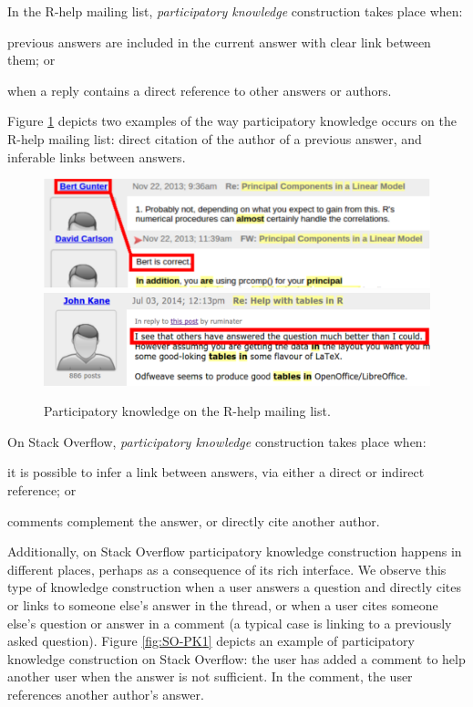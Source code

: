 In the R-help mailing list, \textit{participatory knowledge} construction takes place when:
\begin{enumerate*}[label=(\arabic*)]
  \item previous answers are included in the current answer with clear link between them; or
  \item when a reply contains a direct reference to other answers or authors.
\end{enumerate*}
Figure \ref{fig:ML-PK1} depicts two examples of the way participatory knowledge occurs on the R-help mailing list: direct citation of the author of a previous answer, and inferable links between answers.

    
    \begin{figure}[!htb]
        \centering
        \includegraphics[width=\columnwidth]{Figures/ML-PKimg2}
        \includegraphics[width=\columnwidth]{Figures/ML-PKimg11}
        \caption[Participatory knowledge on the R-help mailing list.]{Participatory knowledge on the R-help mailing list.}
        \label{fig:ML-PK1}
      \vspace{-3mm}
    \end{figure}

On Stack Overflow, \textit{participatory knowledge} construction takes place when:
    \begin{enumerate*}[label=(\arabic*)]
    \item it is possible to infer a link between answers, via either a direct or indirect reference; or
    \item comments complement the answer, or directly cite another author.
    \end{enumerate*}
Additionally, on Stack Overflow participatory knowledge construction happens in different places, perhaps as a consequence of its rich interface. We observe this type of knowledge construction when a user answers a question and directly cites or links to someone else's  answer in the thread, or when a user cites someone else's question or answer in a comment (a typical case is linking to a previously asked question). Figure \ref{fig:SO-PK1} depicts an example of participatory knowledge construction on Stack Overflow: the user has added a comment to help another user when the answer is not sufficient.  In the comment, the user references another author's answer.

